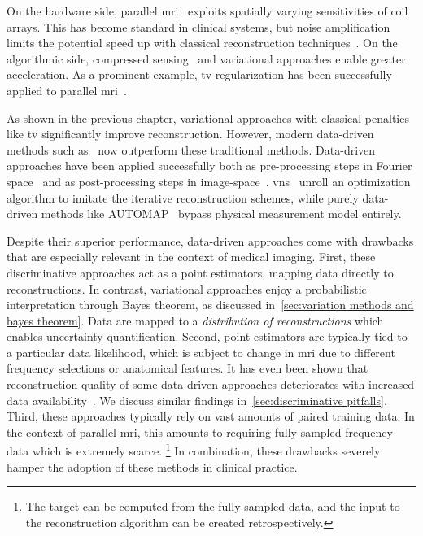 On the hardware side, parallel \gls{mri}~\cite{Roemer1990} exploits spatially varying sensitivities of coil arrays.
This has become standard in clinical systems, but noise amplification limits the potential speed up with classical reconstruction techniques~\cite{Robson2008}.
On the algorithmic side, compressed sensing~\cite{donoho_compressed_2006} and variational approaches enable greater acceleration.
As a prominent example, \gls{tv} regularization has been successfully applied to parallel \gls{mri}~\cite{Knoll2011}.

As shown in the previous chapter, variational approaches with classical penalties like \gls{tv} significantly improve reconstruction.
However, modern data-driven methods such as~\cite{akcakaya_raki_2019,chung_scoremri_2022,hammernik_learning_2017,Narnhofer2019,putzky_irim_2019,zbontar_fastmri_2018,zhou2020dudornet} now outperform these traditional methods.
Data-driven approaches have been applied successfully both as pre-processing steps in Fourier space~\cite{akcakaya_raki_2019} and as post-processing steps in image-space~\cite{zbontar_fastmri_2018}.
\Glspl{vn}~\cite{chen_tnrd_2017,cheng_pdnetworks_2019,hammernik_learning_2017,Kobler2017} unroll an optimization algorithm to imitate the iterative reconstruction schemes, while purely data-driven methods like AUTOMAP~\cite{zhu_image_2018} bypass physical measurement model entirely.

Despite their superior performance, data-driven approaches come with drawbacks that are especially relevant in the context of medical imaging.
First, these discriminative approaches act as a point estimators, mapping data directly to reconstructions.
In contrast, variational approaches enjoy a probabilistic interpretation through Bayes theorem, as discussed in~\cref{sec:variation methods and bayes theorem}.
Data are mapped to a \emph{distribution of reconstructions} which enables uncertainty quantification.
Second, point estimators are typically tied to a particular data likelihood, which is subject to change in \gls{mri} due to different frequency selections or anatomical features.
It has even been shown that reconstruction quality of some data-driven approaches deteriorates with increased data availability~\cite{Antun2020}.
We discuss similar findings in~\cref{sec:discriminative pitfalls}.
Third, these approaches typically rely on vast amounts of paired training data.
In the context of parallel \gls{mri}, this amounts to requiring fully-sampled frequency data which is extremely scarce.
\footnote{%
	The target can be computed from the fully-sampled data, and the input to the reconstruction algorithm can be created retrospectively.
}
In combination, these drawbacks severely hamper the adoption of these methods in clinical practice.

